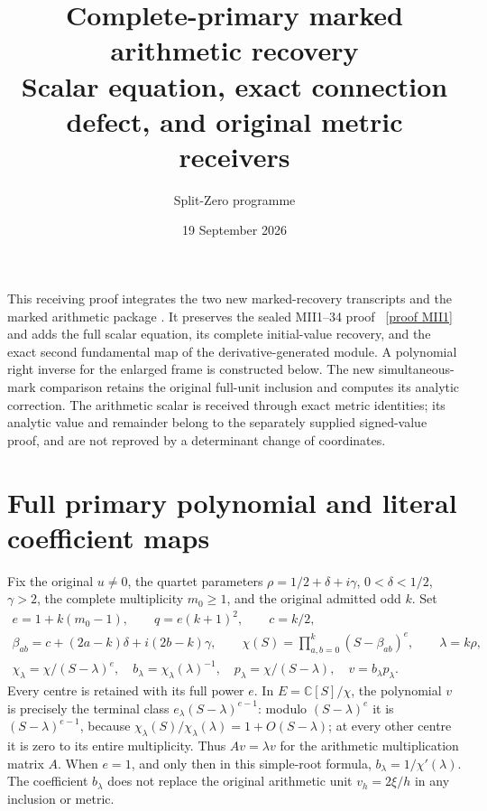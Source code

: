 \documentclass[11pt]{article}
\title{Complete-primary marked arithmetic recovery\\
\large Scalar equation, exact connection defect, and original metric receivers}
\author{Split-Zero programme}
\date{19 September 2026}
\newcommand{\CC}{\mathbb C}
\begin{document}
\maketitle

This receiving proof integrates the two new marked-recovery transcripts
and the marked arithmetic package \cite{arrival}. It preserves the sealed
MII1--34 proof \cite{mii}%
~\href{https://github.com/KokunoYumeto/zeta-function-research-reader/blob/487253b5b01851da5b9b98af4e146fecf1fab902/workbenches/splitzero-tandem/continuations/20260919-arithmetic-signs-marked-classes/first_intake/marked_image/MARKED_IMAGE_RECEIVING_PROOF.tex\#L44}{[proof MII1]}%
{} and adds the full scalar equation, its complete
initial-value recovery, and the exact second fundamental map of the
derivative-generated module. A polynomial right inverse for the enlarged
frame is constructed below. The new simultaneous-mark comparison retains
the original full-unit inclusion and computes its analytic correction.
The arithmetic scalar is received through exact metric identities; its
analytic value and remainder belong to the separately supplied signed-value
proof, and are not reproved by a determinant change of coordinates.

\section{Full primary polynomial and literal coefficient maps}
Fix the original $u\ne0$, the quartet parameters
$\rho=1/2+\delta+i\gamma$, $0<\delta<1/2$, $\gamma>2$, the
complete multiplicity $m_0\ge1$, and the original admitted odd $k$.
Set
\begin{equation}\tag{MAR1}\label{mar:objects}
 \begin{gathered}
 e=1+k(m_0-1),\qquad q=e(k+1)^2,\qquad c=k/2,\\
 \beta_{ab}=c+(2a-k)\delta+i(2b-k)\gamma,\qquad
 \chi(S)=\prod_{a,b=0}^{k}(S-\beta_{ab})^e,\qquad\lambda=k\rho,\\
 \chi_\lambda=\chi/(S-\lambda)^e,\quad
 b_\lambda=\chi_\lambda(\lambda)^{-1},\quad
 p_\lambda=\chi/(S-\lambda),\quad v=b_\lambda p_\lambda.
 \end{gathered}
\end{equation}
Every centre is retained with its full power $e$. In $E=\CC[S]/\chi$,
the polynomial $v$ is precisely the terminal class
$e_\lambda(S-\lambda)^{e-1}$: modulo $(S-\lambda)^e$ it is
$(S-\lambda)^{e-1}$, because
$\chi_\lambda(S)/\chi_\lambda(\lambda)=1+O(S-\lambda)$;
at every other centre it is zero to its entire multiplicity.
Thus $A v=\lambda v$ for the arithmetic multiplication matrix $A$.
When $e=1$, and only then in this simple-root formula,
$b_\lambda=1/\chi'(\lambda)$. The coefficient $b_\lambda$ does not
replace the original arithmetic unit $v_h=2\xi/h$ in any inclusion or metric.
\end{document}
